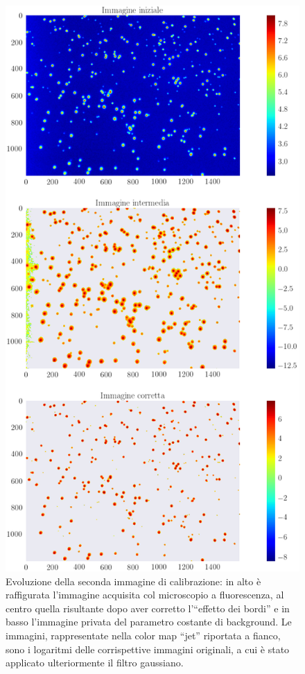 \begin{figure}
 \centering
 \includegraphics[scale=.50]{img/CAP4lg2.png}
 \caption{\small{Evoluzione della seconda immagine di calibrazione: in alto è raffigurata l'immagine acquisita col microscopio a fluorescenza, al centro quella risultante dopo aver corretto l'``effetto dei bordi'' e in basso l'immagine privata del parametro costante di background. Le immagini, rappresentate nella color map ``jet'' riportata a fianco, sono i logaritmi delle corrispettive immagini originali, a cui è stato applicato ulteriormente il filtro gaussiano.}}
 \label{fig:lg2}
\end{figure}


